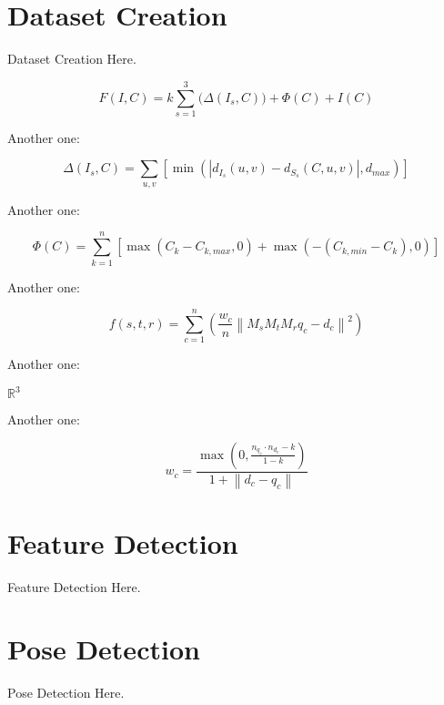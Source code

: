 \documentclass{acmtog}
\begin{document}
\section{Dataset Creation}
\label{sec:datasetcreation}

Dataset Creation Here.

\begin{equation}
F\left(I, C\right)=k\sum_{s=1}^3\bigg(\Delta(I_s, C)\bigg) + \Phi\left(C\right) + I\left(C\right)
\end{equation}

Another one:

\begin{equation}
\Delta\left(I_s,C\right)=\sum_{u,v}\left[\operatorname{min}\left(\left|d_{I_s}(u,v)-d_{S_s}(C,u,v)\right|,d_{max}\right)\right]
\end{equation}

Another one:

\begin{equation}
\Phi\left(C\right) = \sum_{k=1}^n\left[\operatorname{max}\left(C_k-C_{k,max}, 0\right) + \operatorname{max}\left(-\left(C_{k,min}-C_k\right), 0\right)\right]
\end{equation}

Another one:

\begin{equation}
f(s, t, r) = \sum_{c=1}^n\left(\frac{w_c}{n} \left\|M_s M_t M_r q_c - d_c\right\|^2 \right)
\end{equation}

Another one: 

$\mathbb{R}^3$

Another one:

\begin{equation}
w_c = \frac{\operatorname{max}\left(0, \frac{n_{q_c}\cdot n_{d_c} - k}{ 1 - k}\right)}{1 + \left\|d_c-q_c\right\|}
\end{equation}

\section{Feature Detection}
\label{sec:realtimefeaturedetection}

Feature Detection Here.

\section{Pose Detection}
\label{sec:realtimeposedetection}

Pose Detection Here.
\end{document}
